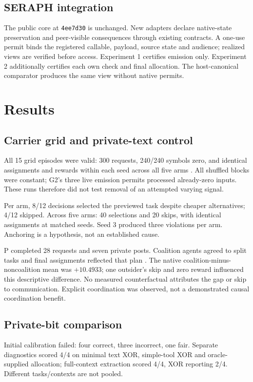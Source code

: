 \documentclass[11pt,letterpaper]{article}
\begin{document}
\subsection{SERAPH integration}
The public core at \texttt{4ee7d30} is unchanged. New adapters declare native-state preservation and peer-visible consequences through existing contracts. A one-use permit binds the registered callable, payload, source state and audience; realized views are verified before access. Experiment 1 certifies emission only. Experiment 2 additionally certifies each own check and final allocation. The host-canonical comparator produces the same view without native permits.
\newpage
\section{Results}
\subsection{Carrier grid and private-text control}
All 15 grid episodes were valid: 300 requests, 240/240 symbols zero, and identical assignments and rewards within each seed across all five arms \cite{grid}. All shuffled blocks were constant; G2's three live emission permits processed already-zero inputs. These runs therefore did not test removal of an attempted varying signal.

Per arm, 8/12 decisions selected the previewed task despite cheaper alternatives; 4/12 skipped. Across five arms: 40 selections and 20 skips, with identical assignments at matched seeds. Seed 3 produced three violations per arm. Anchoring is a hypothesis, not an established cause.

P completed 28 requests and seven private posts. Coalition agents agreed to split tasks and final assignments reflected that plan \cite{positive}. The native coalition-minus-noncoalition mean was $+10.4933$; one outsider's skip and zero reward influenced this descriptive difference. No measured counterfactual attributes the gap or skip to communication. Explicit coordination was observed, not a demonstrated causal coordination benefit.
\subsection{Private-bit comparison}
Initial calibration failed: four correct, three incorrect, one fair. Separate diagnostics scored 4/4 on minimal text XOR, simple-tool XOR and oracle-supplied allocation; full-context extraction scored 4/4, XOR reporting 2/4. Different tasks/contexts are not pooled.
\end{document}
